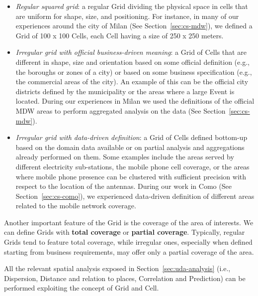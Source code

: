 \begin{itemize}
\item \textit{Regular squared grid}:  a regular \textsf{Grid} dividing the physical space in cells that are uniform for shape, size, and positioning. For instance, in many of our experiences around the city of Milan (See Section~\ref{sec:cs-mdw}), we defined a \textsf{Grid} of 100 x 100 \textsf{Cell}s, each \textsf{Cell} having a size of 250 x 250 meters.

\item \textit{Irregular grid with official business-driven meaning}: a \textsf{Grid} of \textsf{Cell}s that are different in shape, size and orientation based on some official definition (e.g., the boroughs or zones of a city) or based on some business specification (e.g., the commercial areas of the city). An example of this can be the official city districts defined by the municipality or the areas where a large \textsf{Event} is located. During our experiences in Milan we used the definitions of the official MDW areas to perform aggregated analysis on the data (See Section~\ref{sec:cs-mdw}).

\item \textit{Irregular grid with data-driven definition}: a \textsf{Grid} of \textsf{Cell}s defined bottom-up based on the domain data available or on partial analysis and aggregations already performed on them. Some examples include the areas served by different electricity sub-stations, the mobile phone cell coverage, or the areas where mobile phone presence can be clustered with sufficient precision with respect to the location of the antennas. During our work in Como (See Section~\ref{sec:cs-como}), we experienced data-driven definition of different areas related to the mobile network coverage. 

\end{itemize}
Another important feature of the \textsf{Grid} is the coverage of the area of interests. We can define \textsf{Grid}s with \textbf{total coverage} or \textbf{partial coverage}. Typically, regular \textsf{Grid}s tend to feature total coverage, while irregular ones, especially when defined starting from business requirements, may offer only a partial coverage of the area.

All the relevant spatial analysis exposed in Section~\ref{sec:uda-analysis} (i.e., Dispersion, Distance and relation to places, Correlation and Prediction) can be performed exploiting the concept of \textsf{Grid} and \textsf{Cell}.

